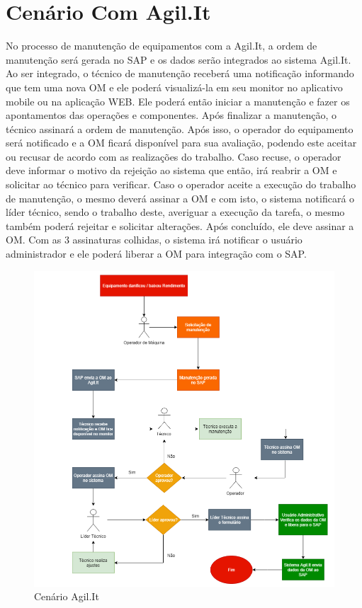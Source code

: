 \section{Cenário Com Agil.It}
No processo de manutenção de equipamentos com a Agil.It, a ordem de manutenção será gerada no SAP e os dados serão integrados ao sistema Agil.It. Ao ser integrado, o técnico de manutenção receberá uma notificação informando que tem uma nova OM e ele poderá visualizá-la em seu monitor no aplicativo mobile ou na aplicação WEB. Ele poderá então iniciar a manutenção e fazer os apontamentos das operações e componentes. Após finalizar a manutenção, o técnico assinará a ordem de manutenção. Após isso, o operador do equipamento será notificado e a OM ficará disponível para sua avaliação, podendo este aceitar ou recusar de acordo com as realizações do trabalho. Caso recuse, o operador deve informar o motivo da rejeição ao sistema que então, irá reabrir a OM e solicitar ao técnico para verificar. Caso o operador aceite a execução do trabalho de manutenção, o mesmo deverá assinar a OM e com isto, o sistema notificará o líder técnico, sendo o trabalho deste, averiguar a execução da tarefa, o mesmo também poderá rejeitar e solicitar alterações. Após concluído, ele deve assinar a OM. Com as 3 assinaturas colhidas, o sistema irá notificar o usuário administrador e ele poderá liberar a OM para integração com o SAP.
\newpage
\begin{figure}[htb]
	\caption{\label{cenario_agilit1}Cenário Agil.It}
	\begin{center}
		\includegraphics[scale=0.52]{./Figuras/cenario-agilit1.png}
	\end{center}
\end{figure}

